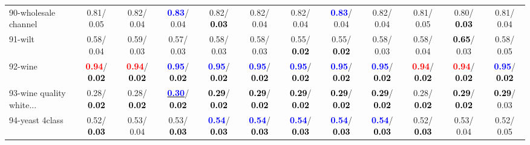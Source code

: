 \begin{table}[h]
\begin{center}
{\begin{tabular}{lc|c|c|c|c|c|c|c|c|c|c}
90-wholesale channel &   0.81/  0.05 &   0.82/  0.04 & \textcolor{blue}{\textbf{  0.83}}/  0.04 &   0.82/\textcolor{black}{\textbf{  0.03}} &   0.82/  0.04 &   0.82/  0.04 & \textcolor{blue}{\textbf{  0.83}}/  0.04 &   0.82/  0.04 &   0.81/  0.05 &   0.80/\textcolor{black}{\textbf{  0.03}} &   0.81/  0.04 \\
91-wilt &   0.58/  0.04 &   0.59/  0.03 &   0.57/  0.03 &   0.58/  0.03 &   0.58/  0.03 &   0.55/\textcolor{black}{\textbf{  0.02}} &   0.55/\textcolor{black}{\textbf{  0.02}} &   0.58/  0.03 &   0.58/  0.04 & \textcolor{black}{\textbf{  0.65}}/  0.03 &   0.58/  0.05 \\
92-wine & \textcolor{red}{\textbf{  0.94}}/\textcolor{black}{\textbf{  0.02}} & \textcolor{red}{\textbf{  0.94}}/\textcolor{black}{\textbf{  0.02}} & \textcolor{blue}{\textbf{  0.95}}/\textcolor{black}{\textbf{  0.02}} & \textcolor{blue}{\textbf{  0.95}}/\textcolor{black}{\textbf{  0.02}} & \textcolor{blue}{\textbf{  0.95}}/\textcolor{black}{\textbf{  0.02}} & \textcolor{blue}{\textbf{  0.95}}/\textcolor{black}{\textbf{  0.02}} & \textcolor{blue}{\textbf{  0.95}}/\textcolor{black}{\textbf{  0.02}} & \textcolor{blue}{\textbf{  0.95}}/\textcolor{black}{\textbf{  0.02}} & \textcolor{red}{\textbf{  0.94}}/\textcolor{black}{\textbf{  0.02}} & \textcolor{red}{\textbf{  0.94}}/\textcolor{black}{\textbf{  0.02}} & \textcolor{blue}{\textbf{  0.95}}/\textcolor{black}{\textbf{  0.02}} \\ \hline
93-wine quality white... &   0.28/\textcolor{black}{\textbf{  0.02}} &   0.28/\textcolor{black}{\textbf{  0.02}} & \underline{\textcolor{blue}{\textbf{  0.30}}}/\textcolor{black}{\textbf{  0.02}} & \textcolor{black}{\textbf{  0.29}}/\textcolor{black}{\textbf{  0.02}} & \textcolor{black}{\textbf{  0.29}}/\textcolor{black}{\textbf{  0.02}} & \textcolor{black}{\textbf{  0.29}}/\textcolor{black}{\textbf{  0.02}} & \textcolor{black}{\textbf{  0.29}}/\textcolor{black}{\textbf{  0.02}} & \textcolor{black}{\textbf{  0.29}}/\textcolor{black}{\textbf{  0.02}} &   0.28/\textcolor{black}{\textbf{  0.02}} & \textcolor{black}{\textbf{  0.29}}/\textcolor{black}{\textbf{  0.02}} & \textcolor{black}{\textbf{  0.29}}/  0.03 \\
94-yeast 4class &   0.52/\textcolor{black}{\textbf{  0.03}} &   0.53/  0.04 &   0.53/\textcolor{black}{\textbf{  0.03}} & \textcolor{blue}{\textbf{  0.54}}/\textcolor{black}{\textbf{  0.03}} & \textcolor{blue}{\textbf{  0.54}}/\textcolor{black}{\textbf{  0.03}} & \textcolor{blue}{\textbf{  0.54}}/\textcolor{black}{\textbf{  0.03}} & \textcolor{blue}{\textbf{  0.54}}/\textcolor{black}{\textbf{  0.03}} & \textcolor{blue}{\textbf{  0.54}}/\textcolor{black}{\textbf{  0.03}} &   0.52/\textcolor{black}{\textbf{  0.03}} &   0.53/  0.04 &   0.52/  0.05 \\\end{tabular}
}\label{strats2a5NN}
\end{center}
\end{table}
